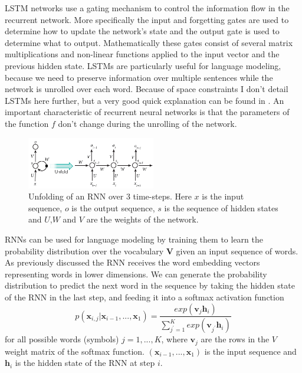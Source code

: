 \documentclass[12pt]{article}
\begin{document}
LSTM networks use a gating mechanism to control the information flow in the recurrent network. More specifically the input and forgetting gates are used to determine how to update the network's state and the output gate is used to determine what to output. Mathematically these gates consist of several matrix multiplications and non-linear functions applied to the input vector and the previous hidden state. LSTMs are particularly useful for language modeling, because we need to preserve information over multiple sentences while the network is unrolled over each word. Because of space constraints I don't detail LSTMs here further, but a very good quick explanation can be found in \cite{LSTM_article}. An important characteristic of recurrent neural networks is that the parameters of the function \(f\) don't change during the unrolling of the network.

\begin{figure}[H]
	\label{fig:231}
	\centering
	\includegraphics[width=0.5\textwidth]{pics/rnn.jpg}
	\caption{Unfolding of an RNN over 3 time-steps. Here \(x\) is the input sequence, \(o\) is the output sequence, \(s\) is the sequence of hidden states and \(U\),\(W\) and \(V\) are the weights of the network. \cite{RNN_pic:2017}}
\end{figure}

RNNs can be used for language modeling by training them to learn the probability distribution over the vocabulary \(\bm{V}\) given an input sequence of words. As previously discussed the RNN receives the word embedding vectors representing words in lower dimensions. We can generate the probability distribution to predict the next word in the sequence by taking the hidden state of the RNN in the last step, and feeding it into a softmax activation function
\begin{equation} \label{eq231b}
p(\bm{x}_{i,j}|\bm{x}_{i-1},...,\bm{x}_1)=\frac{exp(\bm{v}_j\bm{h}_i)}{\sum_{j^{'}=1}^{K}exp(\bm{v}_{j^{'}}\bm{h}_i)}
\end{equation}
for all possible words (symbols) \(j=1,...,K\), where \(\bm{v}_j\) are the rows in the \(V\) weight matrix of the softmax function. \((\bm{x}_{i-1},...,\bm{x}_1)\) is the input sequence and \(\bm{h}_i\) is the hidden state of the RNN at step \(i\).
\end{document}
